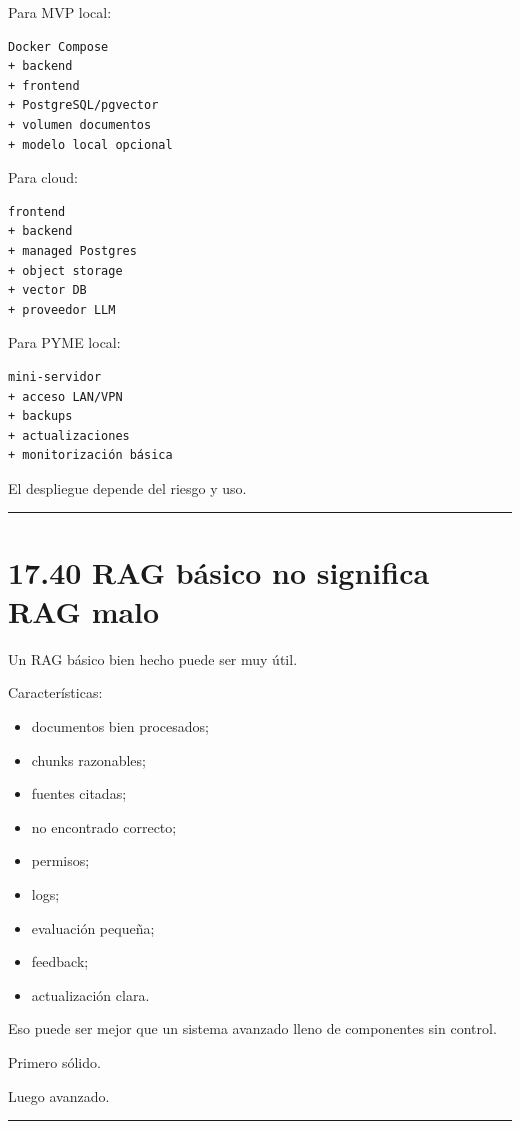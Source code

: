 Para MVP local:

\begin{lstlisting}
Docker Compose
+ backend
+ frontend
+ PostgreSQL/pgvector
+ volumen documentos
+ modelo local opcional
\end{lstlisting}

Para cloud:

\begin{lstlisting}
frontend
+ backend
+ managed Postgres
+ object storage
+ vector DB
+ proveedor LLM
\end{lstlisting}

Para PYME local:

\begin{lstlisting}
mini-servidor
+ acceso LAN/VPN
+ backups
+ actualizaciones
+ monitorización básica
\end{lstlisting}

El despliegue depende del riesgo y uso.

\begin{center}\rule{0.5\linewidth}{0.5pt}\end{center}

\section{17.40 RAG básico no significa RAG
malo}\label{rag-buxe1sico-no-significa-rag-malo}

Un RAG básico bien hecho puede ser muy útil.

Características:

\begin{itemize}
\tightlist
\item
  documentos bien procesados;
\item
  chunks razonables;
\item
  fuentes citadas;
\item
  no encontrado correcto;
\item
  permisos;
\item
  logs;
\item
  evaluación pequeña;
\item
  feedback;
\item
  actualización clara.
\end{itemize}

Eso puede ser mejor que un sistema avanzado lleno de componentes sin
control.

Primero sólido.

Luego avanzado.

\begin{center}\rule{0.5\linewidth}{0.5pt}\end{center}

